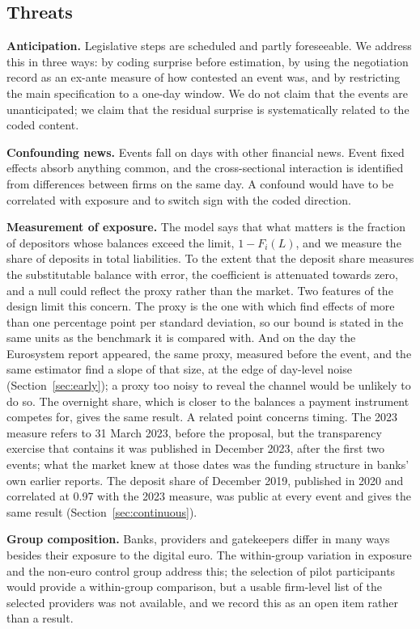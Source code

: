 \documentclass[11pt]{article}
\theoremstyle{plain}\newtheorem{proposition}{Proposition}
\begin{document}
\subsection{Threats}

\textbf{Anticipation.} Legislative steps are scheduled and partly foreseeable. We address this in three ways: by coding surprise before estimation, by using the negotiation record as an ex-ante measure of how contested an event was, and by restricting the main specification to a one-day window. We do not claim that the events are unanticipated; we claim that the residual surprise is systematically related to the coded content.

\textbf{Confounding news.} Events fall on days with other financial news. Event fixed effects absorb anything common, and the cross-sectional interaction is identified from differences between firms on the same day. A confound would have to be correlated with exposure and to switch sign with the coded direction.

\textbf{Measurement of exposure.} The model says that what matters is the fraction of depositors whose balances exceed the limit, $1 - F_i(L)$, and we measure the share of deposits in total liabilities. To the extent that the deposit share measures the substitutable balance with error, the coefficient is attenuated towards zero, and a null could reflect the proxy rather than the market. Two features of the design limit this concern. The proxy is the one with which \citet{burlon2024} find effects of more than one percentage point per standard deviation, so our bound is stated in the same units as the benchmark it is compared with. And on the day the Eurosystem report appeared, the same proxy, measured before the event, and the same estimator find a slope of that size, at the edge of day-level noise (Section~\ref{sec:early}); a proxy too noisy to reveal the channel would be unlikely to do so. The overnight share, which is closer to the balances a payment instrument competes for, gives the same result. A related point concerns timing. The 2023 measure refers to 31 March 2023, before the proposal, but the transparency exercise that contains it was published in December 2023, after the first two events; what the market knew at those dates was the funding structure in banks' own earlier reports. The deposit share of December 2019, published in 2020 and correlated at 0.97 with the 2023 measure, was public at every event and gives the same result (Section~\ref{sec:continuous}).

\textbf{Group composition.} Banks, providers and gatekeepers differ in many ways besides their exposure to the digital euro. The within-group variation in exposure and the non-euro control group address this; the selection of pilot participants would provide a within-group comparison, but a usable firm-level list of the selected providers was not available, and we record this as an open item rather than a result.
\end{document}
